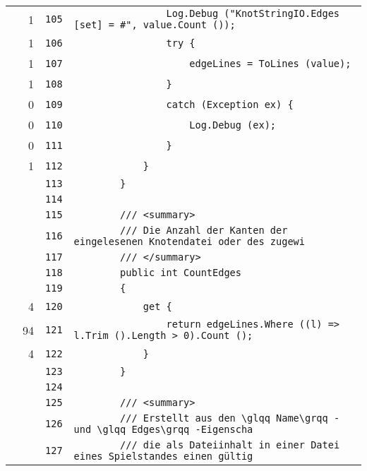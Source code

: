\documentclass[a4paper,10pt]{article}
\begin{document}
\begin{longtable}[l]{lrrl}
\cellcolor{green} & 1 & \verb~105~ & \verb~                Log.Debug ("KnotStringIO.Edges [set] = #", value.Count ());~\\
\cellcolor{green} & 1 & \verb~106~ & \verb~                try {~\\
\cellcolor{green} & 1 & \verb~107~ & \verb~                    edgeLines = ToLines (value);~\\
\cellcolor{green} & 1 & \verb~108~ & \verb~                }~\\
\cellcolor{red} & 0 & \verb~109~ & \verb~                catch (Exception ex) {~\\
\cellcolor{red} & 0 & \verb~110~ & \verb~                    Log.Debug (ex);~\\
\cellcolor{red} & 0 & \verb~111~ & \verb~                }~\\
\cellcolor{green} & 1 & \verb~112~ & \verb~            }~\\
\cellcolor{gray} &  & \verb~113~ & \verb~        }~\\
\cellcolor{gray} &  & \verb~114~ & \verb~~\\
\cellcolor{gray} &  & \verb~115~ & \verb~        /// <summary>~\\
\cellcolor{gray} &  & \verb~116~ & \verb~        /// Die Anzahl der Kanten der eingelesenen Knotendatei oder des zugewi~\\
\cellcolor{gray} &  & \verb~117~ & \verb~        /// </summary>~\\
\cellcolor{gray} &  & \verb~118~ & \verb~        public int CountEdges~\\
\cellcolor{gray} &  & \verb~119~ & \verb~        {~\\
\cellcolor{green} & 4 & \verb~120~ & \verb~            get {~\\
\cellcolor{green} & 94 & \verb~121~ & \verb~                return edgeLines.Where ((l) => l.Trim ().Length > 0).Count ();~\\
\cellcolor{green} & 4 & \verb~122~ & \verb~            }~\\
\cellcolor{gray} &  & \verb~123~ & \verb~        }~\\
\cellcolor{gray} &  & \verb~124~ & \verb~~\\
\cellcolor{gray} &  & \verb~125~ & \verb~        /// <summary>~\\
\cellcolor{gray} &  & \verb~126~ & \verb~        /// Erstellt aus den \glqq Name\grqq - und \glqq Edges\grqq -Eigenscha~\\
\cellcolor{gray} &  & \verb~127~ & \verb~        /// die als Dateiinhalt in einer Datei eines Spielstandes einen gültig~\\

\end{longtable}
\end{document}
